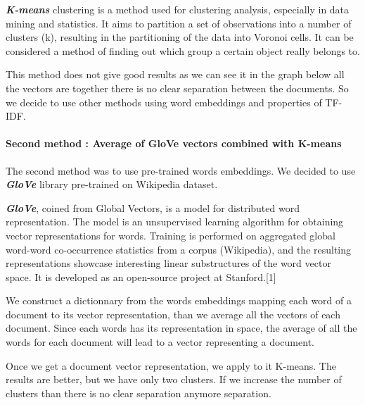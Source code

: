 \documentclass[journal,twocolumn]{IEEEtran}
\begin{document}
\textbf{\emph{K-means}} clustering is a method used for clustering
analysis, especially in data mining and statistics. It aims to partition
a set of observations into a number of clusters (k), resulting in the
partitioning of the data into Voronoi cells. It can be considered a
method of finding out which group a certain object really belongs to.

This method does not give good results as we can see it in the graph
below all the vectors are together there is no clear separation between
the documents. So we decide to use other methods using word embeddings
and properties of TF-IDF.


    \begin{figure}
        \begin{center}\end{center}
        \caption{}
        \label{}
    \end{figure}
    
    \hypertarget{second-method-average-of-glove-vectors-combined-with-k-means}{%
\paragraph{Second method : Average of GloVe vectors combined with
K-means}\label{second-method-average-of-glove-vectors-combined-with-k-means}}

The second method was to use pre-trained words embeddings. We decided to
use \textbf{\emph{GloVe}} library pre-trained on Wikipedia dataset.

\textbf{\emph{GloVe}}, coined from Global Vectors, is a model for
distributed word representation. The model is an unsupervised learning
algorithm for obtaining vector representations for words. Training is
performed on aggregated global word-word co-occurrence statistics from a
corpus (Wikipedia), and the resulting representations showcase
interesting linear substructures of the word vector space. It is
developed as an open-source project at Stanford.{[}1{]}

We construct a dictionnary from the words embeddings mapping each word
of a document to its vector representation, than we average all the
vectors of each document. Since each words has its representation in
space, the average of all the words for each document will lead to a
vector representing a document.

Once we get a document vector representation, we apply to it K-means.
The results are better, but we have only two clusters. If we increase
the number of clusters than there is no clear separation anymore
separation.
\end{document}
